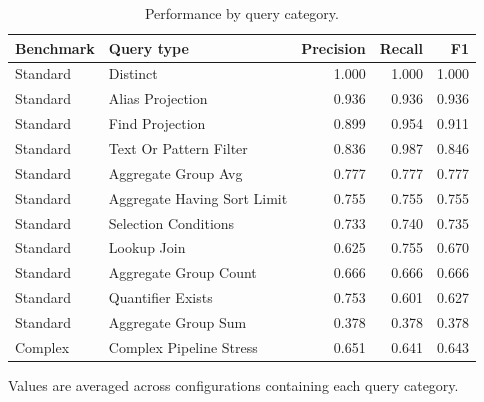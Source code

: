 \begin{table}[htbp]
\centering
\small
\caption{Performance by query category.}
\label{tab:query-type-performance}
\begin{tabular}{llrrr}
\toprule
Benchmark & Query type & Precision & Recall & F1 \\
\midrule
Standard & Distinct & 1.000 & 1.000 & 1.000 \\
Standard & Alias Projection & 0.936 & 0.936 & 0.936 \\
Standard & Find Projection & 0.899 & 0.954 & 0.911 \\
Standard & Text Or Pattern Filter & 0.836 & 0.987 & 0.846 \\
Standard & Aggregate Group Avg & 0.777 & 0.777 & 0.777 \\
Standard & Aggregate Having Sort Limit & 0.755 & 0.755 & 0.755 \\
Standard & Selection Conditions & 0.733 & 0.740 & 0.735 \\
Standard & Lookup Join & 0.625 & 0.755 & 0.670 \\
Standard & Aggregate Group Count & 0.666 & 0.666 & 0.666 \\
Standard & Quantifier Exists & 0.753 & 0.601 & 0.627 \\
Standard & Aggregate Group Sum & 0.378 & 0.378 & 0.378 \\
Complex & Complex Pipeline Stress & 0.651 & 0.641 & 0.643 \\
\bottomrule
\end{tabular}
\par\footnotesize{Values are averaged across configurations containing each query category.}
\end{table}
